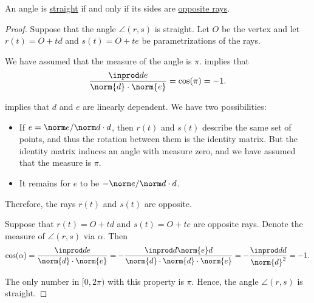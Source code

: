 \begin{proposition}\label{thm:straight_iff_opposite_rays}
  An angle is \hyperref[def:angle/measure/straight]{straight} if and only if its sides are \hyperref[def:geometric_ray/opposite]{opposite rays}.
\end{proposition}
\begin{proof}
  \SufficiencySubProof Suppose that the angle \( \angle(r, s) \) is straight. Let \( O \) be the vertex and let \( r(t) = O + td \) and \( s(t) = O + te \) be parametrizations of the rays.

  We have assumed that the measure of the angle is \( \pi \).  implies that
  \begin{equation*}
    \frac {\inprod d e} {\norm{d} \cdot \norm{e}} = \cos(\pi) = -1.
  \end{equation*}

   implies that \( d \) and \( e \) are linearly dependent. We have two possibilities:
  \begin{itemize}
    \item If \( e = {\norm e} / {\norm d} \cdot d \), then \( r(t) \) and \( s(t) \) describe the same set of points, and thus the rotation between them is the identity matrix. But the identity matrix induces an angle with measure zero, and we have assumed that the measure is \( \pi \).

    \item It remains for \( e \) to be \( -{\norm e} / {\norm d} \cdot d \).
  \end{itemize}

  Therefore, the rays \( r(t) \) and \( s(t) \) are opposite.

  \NecessitySubProof Suppose that \( r(t) = O + td \) and \( s(t) = O + te \) are opposite rays. Denote the measure of \( \angle(r, s) \) via \( \alpha \). Then
  \begin{equation*}
    \cos(\alpha)
    =
    \frac {\inprod d e} {\norm{d} \cdot \norm{e}}
    =
    -\frac {\inprod d {\norm{e} d}} {\norm{d} \cdot \norm{d} \cdot \norm{e}}
    =
    -\frac {\inprod d d} {\norm{d}^2}
    =
    -1.
  \end{equation*}

  The only number in \( [0, 2\pi) \) with this property is \( \pi \). Hence, the angle \( \angle(r, s) \) is straight.
\end{proof}

